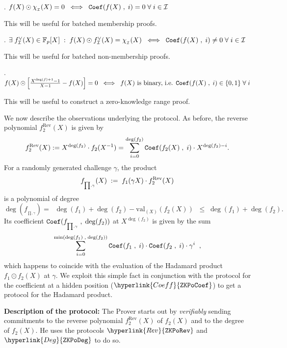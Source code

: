 \documentclass[11pt, lettersize, notitlepage, leqno, footskip=0.6cm]{article}
\newcommand{\bFp}{\mathbb{F}_p}
\newcommand{\LRA}{\Longleftrightarrow}
\newcommand{\mc}{\mathcal}
\newcommand{\mr}{\mathrm}
\newcommand{\vs}{\vspace{-0.15cm}}
\newcommand{\noin}{\noindent}
\numberwithin{equation}{section}
\begin{document}
\noin 1. $f(X)\odot \chi_{_\mc{I}}(X) = 0\;\;\LRA \;\; {\tt{Coef}}(f(X)\;,\;i)= 0\;\forall\; i\in\mc{I}$ 

\vspace{1mm}

\noin This will be useful for batched membership proofs. \vspace{2mm}

\noin 2. $\exists \; f_{\mc{I}}^{\vee}(X)\in \bFp[X]\;:\; f(X)\odot f_{\mc{I}}^{\vee}(X) = \chi_{_\mc{I}}(X)\;\;\LRA\;\; {\tt{Coef}}(f(X)\;,\;i)\neq 0\;\forall\; i\in\mc{I}$ \vspace{1mm}

\noin This will be useful for batched non-membership proofs. \vspace{2mm}

\noin 3. $f(X)\odot \Big[\frac{X^{\deg(f)+1}-1}{X-1} - f(X)\Big] = 0 \;\;\LRA\;\; f(X) \text{ is binary, i.e. }{\tt{Coef}}(f(X)\;,\;i)\in \{0,1\}\;\forall\; i$ \vspace{1mm}

\noin This will be useful to construct a zero-knowledge range proof. \vspace{2mm}

\vspace{3mm}




We now describe the observations underlying the protocol. As before, the reverse polynomial $f_2^{\mr{Rev}}(X)$ is given by  \vs $$ f_2^{\mr{Rev}}(X):= X^{\deg(f_2)}\cdot f_2(X^{-1}) = \sum\limits_{i=0}^{\deg(f_2)} {\tt{Coef}}(f_2(X)\;,\;i)  \cdot X^{\deg(f_2)-i}. \vs $$ For a randomly generated challenge $\gamma$, the product \vs $$f_{_{\prod,\gamma}}(X)\;:=\; f_1(\gamma X)\cdot f_2^{\mr{Rev}}(X) \vs $$ is a polynomial of degree $$ \deg(f_{_{\prod,\gamma}}) =\;\; \deg(f_1)+\deg(f_2) - \mr{val}_{(X)}(f_2(X)) \;\;\leq\; \deg(f_1)+\deg(f_2) . $$ Its coefficient ${\tt{Coef}}(f_{_{\prod,\gamma}}\;,\;\deg(f_2))$ at $X^{\deg(f_2)}$ is given by the sum \vs $$ \sum\limits_{i=0}^{\min(\deg(f_1)\;,\;\deg(f_2))} {\tt{Coef}}(f_1\;,\;i)\cdot {\tt{Coef}}(f_2\;,\;i)\cdot \gamma^i\;\;, $$ which happens to coincide with the evaluation of the Hadamard product $f_1\odot f_2(X)$ at $\gamma$. We exploit this simple fact in conjunction with the protocol for the coefficient at a hidden position ($\hyperlink{Coeff}{\tt{ZKPoCoef}}$) to get a protocol for the Hadamard product. \vspace{2mm}


\noin \textbf{Description of the protocol:} The Prover starts out by \textit{verifiably} sending commitments to the reverse polynomial $f_2^{\mr{Rev}}(X)$ of $f_2(X)$ and to the degree of $f_2(X)$. He uses the protocols $\hyperlink{Rev}{\tt{ZKPoRev}}$ and $\hyperlink{Deg}{\tt{ZKPoDeg}}$ to do so. 
\end{document}
